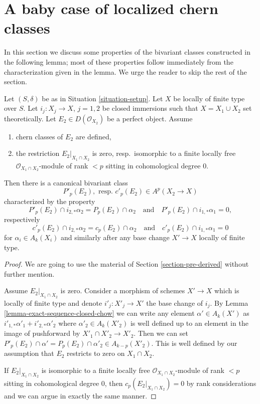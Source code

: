 \section{A baby case of localized chern classes}
\label{section-preparation-localized-chern}

\noindent
In this section we discuss some properties of the bivariant classes
constructed in the following lemma; most of these properties follow
immediately from the characterization given in the lemma. We urge the
reader to skip the rest of the section.

\begin{lemma}
\label{lemma-silly}
Let $(S, \delta)$ be as in Situation \ref{situation-setup}. Let $X$ be
locally of finite type over $S$. Let $i_j : X_j \to X$, $j = 1, 2$
be closed immersions such that $X = X_1 \cup X_2$ set theoretically. Let
$E_2 \in D(\mathcal{O}_{X_2})$ be a perfect object. Assume
\begin{enumerate}
\item chern classes of $E_2$ are defined,
\item the restriction $E_2|_{X_1 \cap X_2}$ is zero,
resp.\ isomorphic to a finite locally free $\mathcal{O}_{X_1 \cap X_2}$-module
of rank $< p$ sitting in cohomological degree $0$.
\end{enumerate}
Then there is a canonical bivariant class
$$
P'_p(E_2),\text{ resp. }c'_p(E_2) \in A^p(X_2 \to X)
$$
characterized by the property
$$
P'_p(E_2) \cap i_{2, *} \alpha_2 = P_p(E_2) \cap \alpha_2
\quad\text{and}\quad
P'_p(E_2) \cap i_{1, *} \alpha_1 = 0,
$$
respectively
$$
c'_p(E_2) \cap i_{2, *} \alpha_2 = c_p(E_2) \cap \alpha_2
\quad\text{and}\quad
c'_p(E_2) \cap i_{1, *} \alpha_1 = 0
$$
for $\alpha_i \in A_k(X_i)$ and similarly after any base change
$X' \to X$ locally of finite type.
\end{lemma}

\begin{proof}
We are going to use the material of Section \ref{section-pre-derived}
without further mention.

\medskip\noindent
Assume $E_2|_{X_1 \cap X_2}$ is zero.
Consider a morphism of schemes $X' \to X$
which is locally of finite type and denote $i'_j : X'_j \to X'$ the
base change of $i_j$. By Lemma \ref{lemma-exact-sequence-closed-chow}
we can write any element $\alpha' \in A_k(X')$ as
$i'_{1, *}\alpha'_1 + i'_{2, *}\alpha'_2$ where
$\alpha'_2 \in A_k(X'_2)$
is well defined up to an element in the image of pushforward
by $X'_1 \cap X'_2 \to X'_2$. Then we can set
$P'_p(E_2) \cap \alpha' = P_p(E_2) \cap \alpha'_2 \in A_{k - p}(X'_2)$. This
is well defined by our assumption that $E_2$ restricts
to zero on $X_1 \cap X_2$.

\medskip\noindent
If $E_2|_{X_1 \cap X_2}$ is isomorphic to a finite locally free
$\mathcal{O}_{X_1 \cap X_2}$-module of rank $< p$ sitting in
cohomological degree $0$, then $c_p(E_2|_{X_1 \cap X_2}) = 0$
by rank considerations and we can argue in exactly the same manner.
\end{proof}


